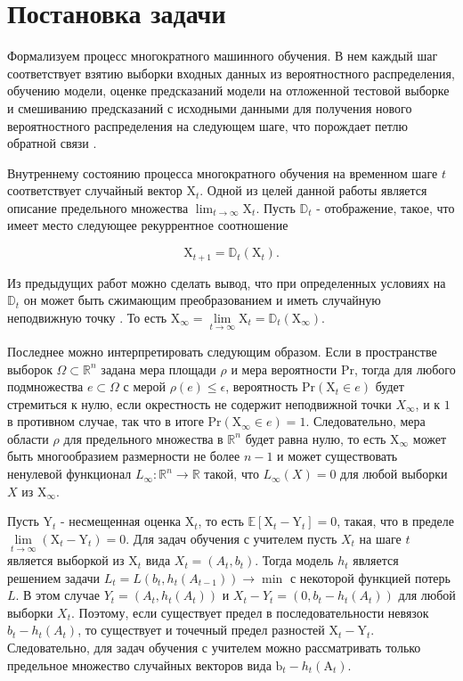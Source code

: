\section{Постановка задачи} \label{sec:Problem_statement}

Формализуем процесс многократного машинного обучения. В нем каждый шаг соответствует взятию выборки входных данных из вероятностного распределения, обучению модели, оценке предсказаний модели на отложенной тестовой выборке и смешиванию предсказаний с исходными данными для получения нового вероятностного распределения на следующем шаге, что порождает петлю обратной связи \cite{khritankov2021existence}.

Внутреннему состоянию процесса многократного обучения на временном шаге $t$ соответствует случайный вектор $\text{X}_t$. Одной из целей данной работы является описание предельного множества $\lim_{t \to \infty} \text{X}_t$. Пусть $\mathbb{D}_t$ - отображение, такое, что имеет место следующее рекуррентное соотношение

\[
    \text{X}_{t+1} = \mathbb{D}_t (\text{X}_t).
\]

Из предыдущих работ \cite{khritankov2021hidden, khritankov2023positive} можно сделать вывод, что при определенных условиях на $\mathbb{D}_t$ он может быть сжимающим преобразованием и иметь случайную неподвижную точку \citep{itoh1977random}. То есть $\text{X}_{\infty} = \lim\limits_{t \to \infty} \text{X}_{t} = \mathbb{D}_t (\text{X}_{\infty})$. 

Последнее можно интерпретировать следующим образом. Если в пространстве выборок $\Omega \subset \mathbb{R}^n$ задана мера площади $\rho$ и мера вероятности $\text{Pr}$, тогда для любого подмножества $e \subset \Omega$ с мерой $\rho(e)\leq \epsilon$, вероятность $\text{Pr}(\text{X}_t \in e)$ будет стремиться к нулю, если окрестность не содержит неподвижной точки $X_{\infty}$, и к $1$ в противном случае, так что в итоге $\text{Pr}(\text{X}_{\infty} \in e) = 1$. Следовательно, мера области $\rho$ для предельного множества в $\mathbb{R}^n$ будет равна нулю, то есть $\text{X}_{\infty}$ может быть многообразием размерности не более $n-1$ и может существовать ненулевой функционал $L_{\infty}: \mathbb{R}^n \to \mathbb{R}$ такой, что $L_{\infty}(X) = 0$ для любой выборки $X$ из $\text{X}_\infty$.

Пусть $\text{Y}_t$ - несмещенная оценка $\text{X}_t$, то есть $\mathbb{E}\left[\text{X}_t - \text{Y}_t\right] = 0$, такая, что в пределе $\lim\limits_{t \to \infty} \left(\text{X}_t - \text{Y}_t \right) = 0$.  Для задач обучения с учителем пусть $X_t$ на шаге $t$ является выборкой из $\text{X}_t$ вида $X_t = (A_t, b_t)$. Тогда модель $h_t$ является решением задачи $L_t = L(b_t, h_t(A_{t-1})) \to \min$ с некоторой функцией потерь $L$. В этом случае $Y_t = (A_t, h_t(A_t))$ и $X_t - Y_t = (0, b_t - h_t(A_{t}))$ для любой выборки $X_t$. Поэтому, если существует предел в последовательности невязок $b_t - h_t(A_t)$, то существует и точечный предел разностей $\text{X}_t - \text{Y}_t$. Следовательно, для задач обучения с учителем можно рассматривать только предельное множество случайных векторов вида $\text{b}_t - h_t(\text{A}_t)$.

